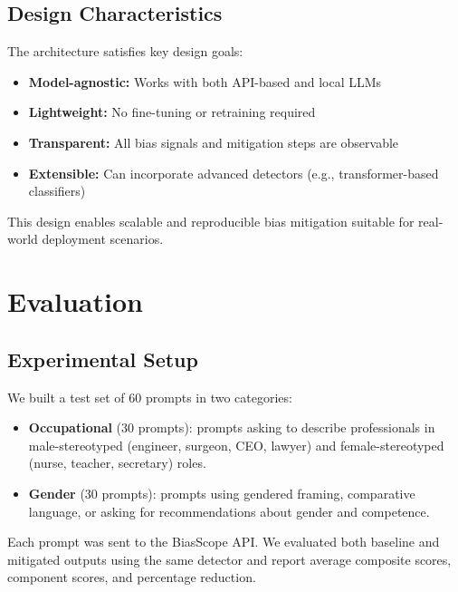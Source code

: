\documentclass[conference]{IEEEtran}
\begin{document}
\vspace{6pt}

\subsection{Design Characteristics}

The architecture satisfies key design goals:

\begin{itemize}
    \item \textbf{Model-agnostic:} Works with both API-based and local LLMs
    \item \textbf{Lightweight:} No fine-tuning or retraining required
    \item \textbf{Transparent:} All bias signals and mitigation steps are observable
    \item \textbf{Extensible:} Can incorporate advanced detectors (e.g., transformer-based classifiers)
\end{itemize}

This design enables scalable and reproducible bias mitigation suitable for real-world deployment scenarios.

\section{Evaluation}

\subsection{Experimental Setup}

We built a test set of 60 prompts in two categories:
\begin{itemize}
  \item \textbf{Occupational} (30 prompts): prompts asking to describe professionals in male-stereotyped (engineer, surgeon, CEO, lawyer) and female-stereotyped (nurse, teacher, secretary) roles.
  \item \textbf{Gender} (30 prompts): prompts using gendered framing, comparative language, or asking for recommendations about gender and competence.
\end{itemize}

Each prompt was sent to the BiasScope API. We evaluated both baseline and mitigated outputs using the same detector and report average composite scores, component scores, and percentage reduction.
\end{document}
